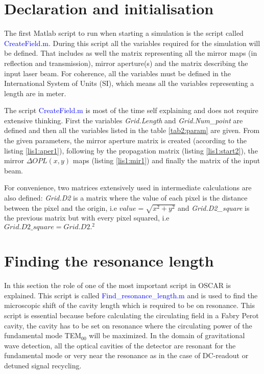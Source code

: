 \section{Declaration and initialisation}
\label{sec2:2.2}
The first Matlab script to run when starting a simulation is the script called \textcolor{blue}{CreateField.m}. During this script all the variables required for the simulation will be defined. That includes as well the matrix representing all the mirror maps (in reflection and transmission), mirror aperture(s) and the matrix describing the input laser beam. For coherence, all the variables must be defined in the International System of Units (SI), which means all the variables representing a length are in meter.

The script \textcolor{blue}{CreateField.m} is most of the time self explaining and does not require extensive thinking. First the variables \textsl{Grid.Length} and \textsl{Grid.Num\_point} are defined and then all the variables listed in the table \ref{tab2:param} are given. From the given parameters, the mirror aperture matrix is created (according to the listing \ref{lis1:aper1}), following by the propagation matrix (listing \ref{lis1:start2}), the mirror $\Delta OPL(x,y)$ maps (listing \ref{lis1:mir1}) and finally the matrix of the input beam.

For convenience, two matrices extensively used in intermediate calculations are also defined: \textsl{Grid.D2} is a matrix where the value of each pixel is the distance between the pixel and the origin, i.e $value = \sqrt{x^2+y^2}$ and \textsl{Grid.D2\_square} is the previous matrix but with every pixel squared, i.e $Grid.D2\_square = Grid.D2.^2$

\section{Finding the resonance length}
\label{sec2.2}

In this section the role of one of the most important script in OSCAR is explained. This script is called \textcolor{blue}{Find\_resonance\_length.m} and is used to find the microscopic shift of the cavity length which is required to be on resonance. This script is essential because before calculating the circulating field in a Fabry Perot cavity, the cavity has to be set on resonance where the circulating power of the fundamental mode TEM$_{00}$ will be maximized. In the domain of gravitational wave detection, all the optical cavities of the detector are resonant for the fundamental mode or very near the resonance as in the case of DC-readout or detuned signal recycling.\\


